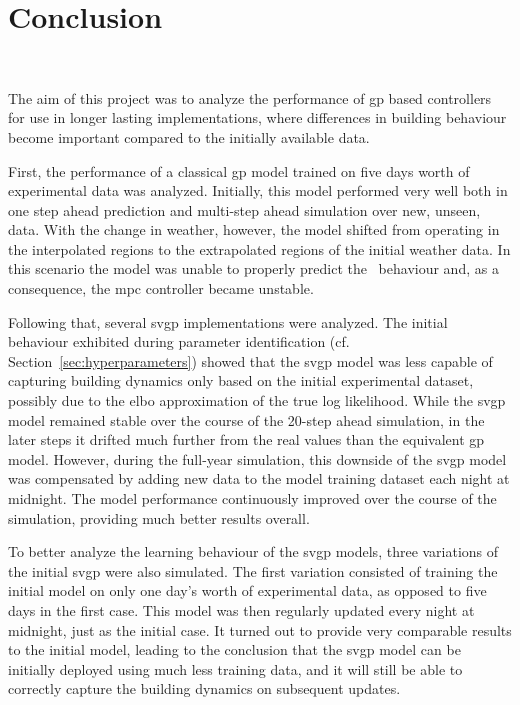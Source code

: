 \section{Conclusion}~\label{sec:conclusion}

The aim of this project was to analyze the performance of \acrshort{gp} based
controllers for use in longer lasting implementations, where differences in
building behaviour become important compared to the initially available data.

First, the performance of a classical \acrshort{gp} model trained on five days
worth of experimental data was analyzed. Initially, this model performed very
well both in one step ahead prediction and multi-step ahead simulation over new,
unseen, data. With the change in weather, however, the model shifted from
operating in the interpolated regions to the extrapolated regions of the initial
weather data. In this scenario the model was unable to properly predict the
\pdome\ behaviour and, as a consequence, the \acrshort{mpc} controller became
unstable.

Following that, several \acrshort{svgp} implementations were analyzed. The
initial behaviour exhibited during parameter identification (cf.
Section~\ref{sec:hyperparameters}) showed that the \acrshort{svgp} model was
less capable of capturing building dynamics only based on the initial
experimental dataset, possibly due to the \acrshort{elbo} approximation of the
true log likelihood. While the \acrshort{svgp} model remained stable over the
course of the 20-step ahead simulation, in the later steps it drifted much
further from the real values than the equivalent \acrshort{gp} model.
However, during the full-year simulation, this downside of the \acrshort{svgp}
model was compensated by adding new data to the model training dataset each
night at midnight. The model performance continuously improved over the course
of the simulation, providing much better results overall.

To better analyze the learning behaviour of the \acrshort{svgp} models, three
variations of the initial \acrshort{svgp} were also simulated. The first
variation consisted of training the initial model on only one day's worth of
experimental data, as opposed to five days in the first case. This model was
then regularly updated every night at midnight, just as the initial case. It
turned out to provide very comparable results to the initial model, leading to
the conclusion that the \acrshort{svgp} model can be initially deployed using
much less training data, and it will still be able to correctly capture the
building dynamics on subsequent updates.

